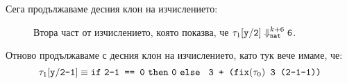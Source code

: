 \begin{landscape}
  Сега продължаваме десния клон на изчислението:
  \begin{framed}
    \begin{figure}[H]
      \begin{prooftree}
      \end{prooftree}
      \caption{Втора част от изчислението, която показва, че $\tau_1\substConst{y}{2} \opsem{k+6}{nat} \vv{6}$.}
    \end{figure}
  \end{framed}
  Отново продължаваме с десния клон на изчислението, като тук вече имаме, че:
  \[\tau_1\substConst{y}{2-1} \equiv \ifelse{\vv{2-1 == 0}}{\vv{0}}{\vv{ 3 + (}\fix(\tau_0)\vv{ 3 (2-1-1))}}\]


\end{landscape}
